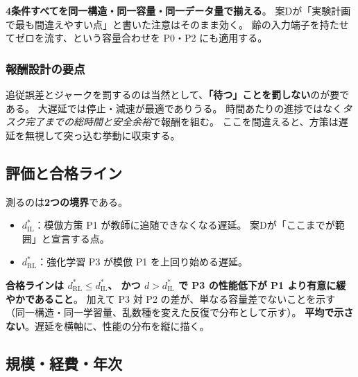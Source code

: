 \documentclass[11pt,a4paper]{article}
\newcommand{\prob}[1]{\textbf{\textcolor{red!55!black}{#1}}}
\newcommand{\keyp}[1]{\textbf{\textcolor{blue!45!black}{#1}}}
\begin{document}
\noindent
\prob{4条件すべてを同一構造・同一容量・同一データ量で揃える}。
案Dが「実験計画で最も間違えやすい点」と書いた注意はそのまま効く。
齢の入力端子を持たせてゼロを流す、という容量合わせを P0・P2 にも適用する。

\subsubsection*{報酬設計の要点}

追従誤差とジャークを罰するのは当然として、\keyp{「待つ」ことを罰しない}のが要である。
大遅延では停止・減速が最適でありうる。
時間あたりの進捗ではなく\emph{タスク完了までの総時間と安全余裕}で報酬を組む。
ここを間違えると、方策は遅延を無視して突っ込む挙動に収束する。

\subsection{評価と合格ライン}

測るのは\keyp{2つの境界}である。

\begin{itemize}[leftmargin=1.4em,itemsep=3pt]
  \item $d^{*}_{\mathrm{IL}}$：模倣方策 P1 が教師に追随できなくなる遅延。
        案Dが「ここまでが範囲」と宣言する点。
  \item $d^{*}_{\mathrm{RL}}$：強化学習 P3 が模倣 P1 を上回り始める遅延。
\end{itemize}

\noindent
\keyp{合格ラインは $d^{*}_{\mathrm{RL}}\le d^{*}_{\mathrm{IL}}$、
かつ $d>d^{*}_{\mathrm{IL}}$ で P3 の性能低下が P1 より有意に緩やかであること}。
加えて P3 対 P2 の差が、単なる容量差でないことを示す
（同一構造・同一学習量、乱数種を変えた反復で分布として示す）。
\prob{平均で示さない}。遅延を横軸に、性能の分布を縦に描く。

\subsection{規模・経費・年次}
\end{document}
